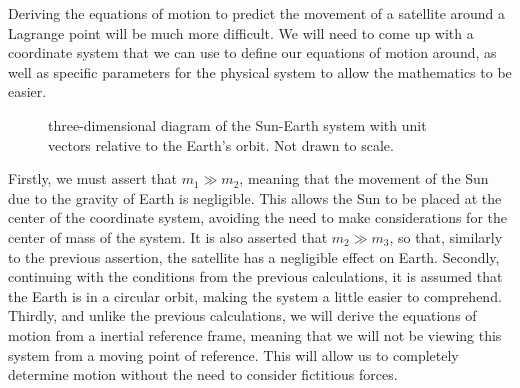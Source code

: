 Deriving the equations of motion to predict the movement of a satellite around a Lagrange point will be much more difficult.
We will need to come up with a coordinate system that we can use to define our equations of motion around, as well as specific parameters for the physical system to allow the mathematics to be easier. \par
\begin{wrapfigure}{l}{0.6\textwidth}
	\centering
	\vspace*{0.25cm}
	\caption{three-dimensional diagram of the Sun-Earth system with unit vectors relative to the Earth's orbit. Not drawn to scale.}
	\label{fig:3d-coords}
\end{wrapfigure}
Firstly, we must assert that $m_1 \gg m_2$, meaning that the movement of the Sun due to the gravity of Earth is negligible.
This allows the Sun to be placed at the center of the coordinate system, avoiding the need to make considerations for the center of mass of the system.
It is also asserted that $m_2 \gg m_3$, so that, similarly to the previous assertion, the satellite has a negligible effect on Earth.
Secondly, continuing with the conditions from the previous calculations, it is assumed that the Earth is in a circular orbit, making the system a little easier to comprehend.
Thirdly, and unlike the previous calculations, we will derive the equations of motion from a inertial reference frame, meaning that we will not be viewing this system from a moving point of reference.
This will allow us to completely determine motion without the need to consider fictitious forces.

